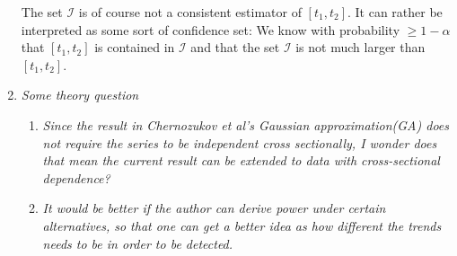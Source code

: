 \documentclass[a4paper,12pt]{article}
\begin{document}
\begin{enumerate}[label=(\arabic*),leftmargin=0.7cm]
The set $\mathcal{I}$ is of course not a consistent estimator of $[t_1,t_2]$. It can rather be interpreted as some sort of confidence set: We know with probability $\ge 1-\alpha$ that $[t_1,t_2]$ is contained in $\mathcal{I}$ and that the set $\mathcal{I}$ is not much larger than $[t_1,t_2]$.  




\item \textit{Some theory question}

\begin{enumerate}[label=(\roman*)]
\item \textit{Since the result in Chernozukov et al's Gaussian approximation(GA) does not require the series to be independent cross sectionally, I wonder does that mean the current result can be extended to data with cross-sectional dependence?}
\item \textit{It would be better if the author can derive power under certain alternatives, so that one can get a better idea as how different the trends needs to be in order to be detected.}


\end{enumerate}
\end{enumerate}
\end{document}

